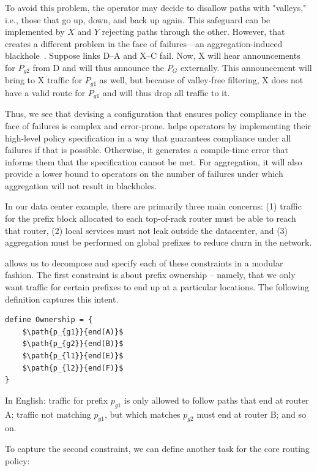 To avoid this problem, the operator may decide to disallow paths with "valleys," i.e., those that go up, down, and back up again. This safeguard can be implemented by $X$ and $Y$ rejecting paths through the other. However, that creates a different problem in the face of failures---an aggregation-induced blackhole~\cite{xx}. Suppose links D--A and X--C fail. Now, X will hear announcements for $P_{g2}$ from D and will thus announce the $P_G$ externally. This announcement will bring to X traffic for $P_{g1}$ as well, but because of valley-free filtering, X does not have a valid route for $P_{g1}$ and will thus drop all traffic to it.

Thus, we see that devising a configuration that ensures policy compliance in the face of failures is complex and error-prone. \sysname helps operators by implementing their high-level policy specification in a way that guarantees compliance under all failures if that is possible. Otherwise, it generates a compile-time error that informs them that the specification cannot be met. For aggregation, it will also provide a lower bound to operators on the number of failures under which aggregation will not result in blackholes.

In our data center example,
there are primarily three main concerns:
(1) traffic for the prefix block allocated to each top-of-rack router must be able to reach that router,
(2) local services must not leak outside the datacenter, and
(3) aggregation must be performed on global prefixes to reduce churn
in the network.

\sysname allows us to decompose and specify each of these constraints in a modular fashion. The first constraint is about prefix ownership -- namely, that we only want traffic for certain prefixes to end up at a particular locations. The following definition captures this intent.

\begin{lstlisting}[mathescape=true]
define Ownership = {
    $\path{p_{g1}}{end(A)}$
    $\path{p_{g2}}{end(B)}$
    $\path{p_{l1}}{end(E)}$
    $\path{p_{l2}}{end(F)}$
}
\end{lstlisting}

In English: traffic for prefix $p_{g1}$ is only allowed to follow paths that
end at router A; traffic not matching $p_{g1}$, but which matches $p_{g2}$ must
end at router B; and so on.

To capture the second constraint, we can define another task for the core
routing policy:

